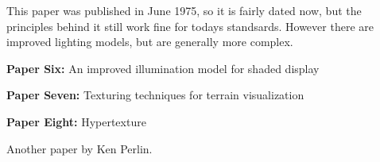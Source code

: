 \documentclass{scrartcl}
\begin{document}
This paper was published in June 1975, so it is fairly dated now, but the principles behind it still work fine for todays standsards. However there are improved lighting models, but are generally more complex.


\par
\textbf{Paper Six:}
An improved illumination model for shaded display
\cite{whitted2005improved}
\par

\textbf{Paper Seven:}
Texturing techniques for terrain visualization
\cite{dollner2000texturing}
\par

\textbf{Paper Eight:}
Hypertexture
\cite{perlin1989hypertexture}
\par

Another paper by Ken Perlin.

\par




\end{document}
